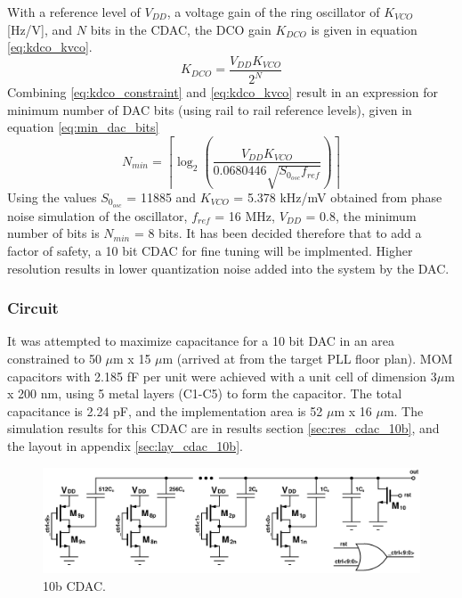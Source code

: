 	With a reference level of $V_{DD}$, a voltage gain of the ring oscillator of $K_{VCO}$ [Hz/V], and $N$ bits in the CDAC, the DCO gain $K_{DCO}$ is given in equation \ref{eq:kdco_kvco}.
	\begin{equation}\label{eq:kdco_kvco}
		K_{DCO} = \frac{V_{DD}K_{VCO}}{2^N}
	\end{equation}
	Combining \ref{eq:kdco_constraint} and \ref{eq:kdco_kvco} result in an expression for minimum number of DAC bits (using rail to rail reference levels), given in equation \ref{eq:min_dac_bits}
	\begin{equation}\label{eq:min_dac_bits}
		N_{min} = \left\lceil \log_2\left( \frac{V_{DD}K_{VCO}}{0.0680446\sqrt{S_{0_{osc}} f_{ref}}} \right)\right\rceil
	\end{equation}
	Using the values $S_{0_{osc}}$ = 11885 and $K_{VCO}$ = 5.378 kHz/mV obtained from phase noise simulation of the oscillator, $f_{ref}$ = 16 MHz, $V_{DD}$ = 0.8, the minimum number of bits is $N_{min}$ = 8 bits. It has been decided therefore that to add a factor of safety, a 10 bit CDAC for fine tuning will be implmented. Higher resolution results in lower quantization noise added into the system by the DAC.

		\subsubsection{Circuit}
		It was attempted to maximize capacitance for a 10 bit DAC in an area constrained to 50 $\mu$m x 15 $\mu$m (arrived at from the target PLL floor plan). MOM capacitors with 2.185 fF per unit were achieved with a unit cell of dimension 3$\mu$m x 200 nm, using 5 metal layers (C1-C5) to form the capacitor. The total capacitance is 2.24 pF, and the implementation area is 52 $\mu$m x 16 $\mu$m. The simulation results for this CDAC are in results section \ref{sec:res_cdac_10b}, and the layout in appendix \ref{sec:lay_cdac_10b}.
	
			\begin{figure}[htb!]
			        \centering
			        \includegraphics[width=\textwidth, angle=0]{./figs/design/cdac_10b}
			    \caption{10b CDAC.}
			    \label{fig:10b_cdac_cir}
			\end{figure}

